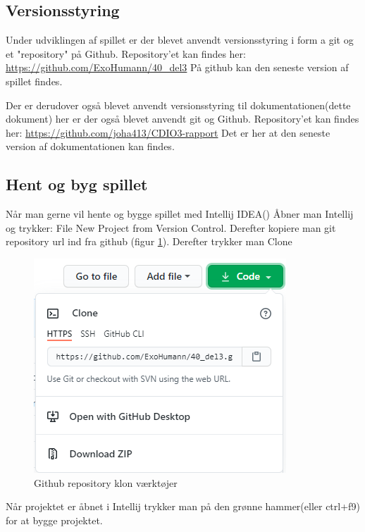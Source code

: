 \subsection{Versionsstyring}
Under udviklingen af spillet er der blevet anvendt versionsstyring i form a git og et "repository" på Github. Repository'et kan findes her: \url{https://github.com/ExoHumann/40_del3}
På github kan den seneste version af spillet findes. 

\vspace{.5cm}
Der er derudover også blevet anvendt versionsstyring til dokumentationen(dette dokument) her er der også blevet anvendt git og Github. Repository'et kan findes her:
\url{https://github.com/joha413/CDIO3-rapport}
Det er her at den seneste version af dokumentationen kan findes.

\subsection{Hent og byg spillet}
Når man gerne vil hente og bygge spillet med Intellij IDEA(\cite{noauthor_intellij_nodate}) Åbner man Intellij og trykker: File \textrightarrow New \textrightarrow Project from Version Control. Derefter kopiere man git repository url ind fra github (figur \ref{fig:github}). Derefter trykker man Clone
\begin{figure}[H]
    \centering
    \includegraphics{sources/github.PNG}
    \caption{Github repository klon værktøjer}
    \label{fig:github}
\end{figure}

Når projektet er åbnet i Intellij trykker man på den grønne hammer(eller ctrl+f9) for at bygge projektet.
